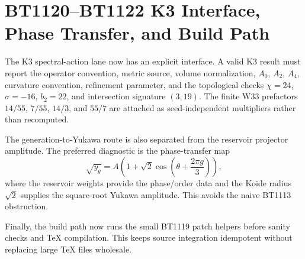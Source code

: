 \section{BT1120--BT1122 K3 Interface, Phase Transfer, and Build Path}
\label{sec:bt1120-bt1122-k3-yukawa-build-path}

The K3 spectral-action lane now has an explicit interface.  A valid K3 result must report the operator convention, metric source, volume normalization, $A_0$, $A_2$, $A_4$, curvature convention, refinement parameter, and the topological checks $\chi=24$, $\sigma=-16$, $b_2=22$, and intersection signature $(3,19)$.  The finite W33 prefactors $14/55$, $7/55$, $14/3$, and $55/7$ are attached as seed-independent multipliers rather than recomputed.

The generation-to-Yukawa route is also separated from the reservoir projector amplitude.  The preferred diagnostic is the phase-transfer map
\[
\sqrt{y_g}=A\left(1+\sqrt2\cos\left(\theta+\frac{2\pi g}{3}\right)\right),
\]
where the reservoir weights provide the phase/order data and the Koide radius $\sqrt2$ supplies the square-root Yukawa amplitude.  This avoids the naive BT1113 obstruction.

Finally, the build path now runs the small BT1119 patch helpers before sanity checks and TeX compilation.  This keeps source integration idempotent without replacing large TeX files wholesale.
